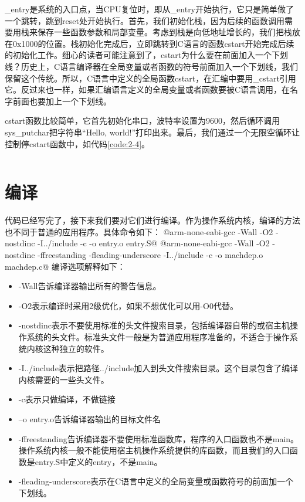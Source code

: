 \documentclass[main.tex]{subfiles}
\begin{document}
\begin{CJK*}{UTF8}{song}
\begin{code}
\label{code:2-3}
\inputminted[linenos,numbersep=5pt,frame=lines,framesep=2mm]{gas}{src/chapter02/kernel/entry.S}
\end{code}


\_entry是系统的入口点，当CPU复位时，即从\_entry开始执行，它只是简单做了一个跳转，跳到reset处开始执行。首先，我们初始化栈，因为后续的函数调用需要用栈来保存一些函数参数和局部变量。考虑到栈是向低地址增长的，我们把栈放在0x1000的位置。栈初始化完成后，立即跳转到C语言的函数cstart开始完成后续的初始化工作。细心的读者可能注意到了，cstart为什么要在前面加入一个下划线？历史上，C语言编译器在全局变量或者函数的符号前面加入一个下划线，我们保留这个传统。所以，C语言中定义的全局函数cstart，在汇编中要用\_cstart引用它。反过来也一样，如果汇编语言定义的全局变量或者函数要被C语言调用，在名字前面也要加上一个下划线。

\par
cstart函数比较简单，它首先初始化串口，波特率设置为9600，然后循环调用sys\_putchar把字符串“Hello, world!”打印出来。最后，我们通过一个无限空循环让控制停cstart函数中，如代码\ref{code:2-4}。

\begin{code}
\label{code:2-4}
\inputminted[firstline=50,lastline=61,linenos,numbersep=5pt,frame=lines,framesep=2mm]{c}{src/chapter02/kernel/machdep.c}
\end{code}


\section{编译}
代码已经写完了，接下来我们要对它们进行编译。作为操作系统内核，编译的方法也不同于普通的应用程序。具体命令如下：
@arm-none-eabi-gcc -Wall -O2 -nostdinc -I../include -c -o entry.o entry.S@
@arm-none-eabi-gcc -Wall -O2 -nostdinc -ffreestanding -fleading-underscore -I../include -c -o machdep.o machdep.c@
\noindent
编译选项解释如下：
\begin{itemize}
	\item -Wall告诉编译器输出所有的警告信息。
	\item -O2表示编译时采用2级优化，如果不想优化可以用-O0代替。
	\item -nostdinc表示不要使用标准的头文件搜索目录，包括编译器自带的或宿主机操作系统的头文件。标准头文件一般是为普通应用程序准备的，不适合于操作系统内核这种独立的软件。
	\item -I../include表示把路径../include加入到头文件搜索目录。这个目录包含了编译内核需要的一些头文件。
	\item -c表示只做编译，不做链接
	\item –o entry.o告诉编译器输出的目标文件名
	\item -ffreestanding告诉编译器不要使用标准函数库，程序的入口函数也不是main。操作系统内核一般不能使用宿主机操作系统提供的库函数，而且我们的入口函数是entry.S中定义的entry，不是main。
	\item -fleading-underscore表示在C语言中定义的全局变量或函数符号的前面加一个下划线。
\end{itemize}


\end{CJK*}
\end{document}

